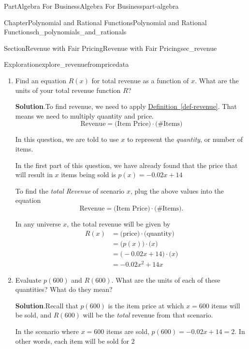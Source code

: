 \documentclass{tufte-book}
\newcommand{\blocktitlefont}{\relax}
\newcommand{\xreffont}{\relax}
\numberwithin{equation}{chapter}
\begin{document}
\begin{partptx}{Part}{Algebra For Business}{}{Algebra For Business}{}{}{part-algebra}
\begin{chapterptx}{Chapter}{Polynomial and Rational Functions}{}{Polynomial and Rational Functions}{}{}{ch_polynomials_and_rationals}
\begin{sectionptx}{Section}{Revenue with Fair Pricing}{}{Revenue with Fair Pricing}{}{}{sec_revenue}
\begin{exploration}{Exploration}{}{explore_revenuefrompricedata}
\begin{enumerate}[font=\bfseries,label=(\alph*),ref=\alph*]
\begin{equation*}
p(x) = -0.02 (x-100) + 12 = \dots = -0.02x + 14
\end{equation*}
%
\item{}Find an equation \(R(x)\) for total revenue as a function of \(x\). What are the units of your total revenue function \(R\)?%
\par\smallskip%
\noindent\textbf{\blocktitlefont Solution}.\hypertarget{explore_revenuefrompricedata-3-2}{}\quad{}To find revenue, we need to apply \hyperref[def-revenue]{Definition~{\xreffont\ref{def-revenue}}}.  That means we need to multiply quantity and price.%
\begin{equation*}
\text{Revenue} = \Big(\text{Item Price}\Big) \cdot \Big(\text{\# Items}\Big)
\end{equation*}
%
\par
In this question, we are told to use \(x\) to represent the \emph{quantity}, or number of items.%
\par
In the first part of this question, we have already found that the price that will result in \(x\) items being sold is \(p(x) = -0.02x + 14\)%
\par
To find the \emph{total Revenue} of scenario \(x\), plug the above values into the equation%
\begin{equation*}
\text{Revenue} = \Big(\text{Item Price}\Big) \cdot \Big(\text{\# Items}\Big)\text{.}
\end{equation*}
%
\par
In any universe \(x\), the total revenue will be given by%
\begin{equation*}
\begin{aligned}
R(x)  &=  \Big(\text{price}\Big) \cdot \Big(\text{quantity}\Big) \\
&=  \Big(p(x) \Big) \cdot \Big(x\Big) \\
&=  \Big( -0.02x + 14\Big)\cdot \Big(x\Big) \\ 
&=   -0.02x^2 + 14x\end{aligned}
\end{equation*}
%
\item{}Evaluate \(p(600)\) and \(R(600)\). What are the units of each of these quantities? What do they mean?%
\par\smallskip%
\noindent\textbf{\blocktitlefont Solution}.\hypertarget{explore_revenuefrompricedata-4-2}{}\quad{}Recall that \(p(600)\) is the item price at which \(x=600\) items will be sold, and \(R(600)\) will be the \emph{total} revenue from that scenario.%
\par
In the scenario where \(x=600\) items are sold, \(p(600) = -0.02x + 14 = 2\).  In other words, each item will be sold for \textdollar{}\(2\)%

\end{enumerate}
\end{exploration}
\end{sectionptx}
\end{chapterptx}
\end{partptx}
\end{document}
